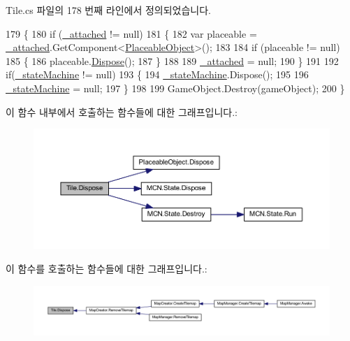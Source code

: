 Tile.\+cs 파일의 178 번째 라인에서 정의되었습니다.


\begin{DoxyCode}
179     \{
180         \textcolor{keywordflow}{if} (\hyperlink{class_tile_aa548ae60732f4d054b6777436baefdd5}{\_attached} != null)
181         \{
182             var placeable = \hyperlink{class_tile_aa548ae60732f4d054b6777436baefdd5}{\_attached}.GetComponent<\hyperlink{class_placeable_object}{PlaceableObject}>();
183 
184             \textcolor{keywordflow}{if} (placeable != null)
185             \{
186                 placeable.\hyperlink{class_placeable_object_a8bd49b7db556556502a0518fc833be48}{Dispose}();
187             \}
188 
189             \hyperlink{class_tile_aa548ae60732f4d054b6777436baefdd5}{\_attached} = null;
190         \}
191 
192         \textcolor{keywordflow}{if}(\hyperlink{class_tile_a822a1bffe56b1193b8c5c61070ea7827}{\_stateMachine} != null)
193         \{
194             \hyperlink{class_tile_a822a1bffe56b1193b8c5c61070ea7827}{\_stateMachine}.Dispose();
195 
196             \hyperlink{class_tile_a822a1bffe56b1193b8c5c61070ea7827}{\_stateMachine} = null;
197         \}
198 
199         GameObject.Destroy(gameObject);
200     \}
\end{DoxyCode}


이 함수 내부에서 호출하는 함수들에 대한 그래프입니다.\+:\nopagebreak
\begin{figure}[H]
\begin{center}
\leavevmode
\includegraphics[width=350pt]{class_tile_a6e8a801e95a29156cbf32024e45c6596_cgraph}
\end{center}
\end{figure}




이 함수를 호출하는 함수들에 대한 그래프입니다.\+:\nopagebreak
\begin{figure}[H]
\begin{center}
\leavevmode
\includegraphics[width=350pt]{class_tile_a6e8a801e95a29156cbf32024e45c6596_icgraph}
\end{center}
\end{figure}


